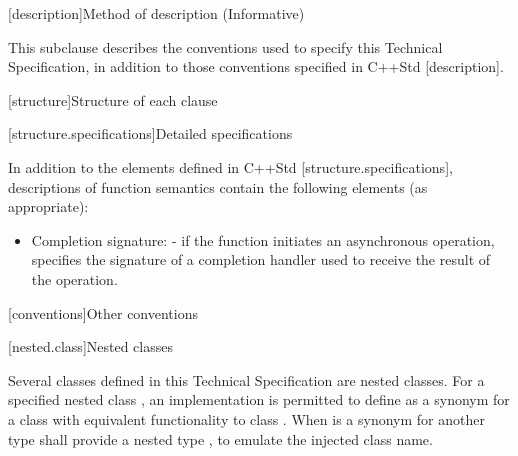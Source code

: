 
[description]{Method of description (Informative)}

\pnum
 This subclause describes the conventions used to specify this Technical Specification, in addition to those conventions specified in C++Std [description].


[structure]{Structure of each clause}


[structure.specifications]{Detailed specifications}

\pnum
 In addition to the elements defined in C++Std [structure.specifications], descriptions of function semantics contain the following elements (as appropriate):

\begin{itemize}
\item
Completion signature: - if the function initiates an asynchronous operation, specifies the signature of a completion handler used to receive the result of the operation.
\end{itemize}




[conventions]{Other conventions}


[nested.class]{Nested classes}

\pnum
Several classes defined in this Technical Specification are nested classes. For a specified nested class , an implementation is permitted to define  as a synonym for a class with equivalent functionality to class . \enternote When  is a synonym for another type  shall provide a nested type , to emulate the injected class name. \exitnote





